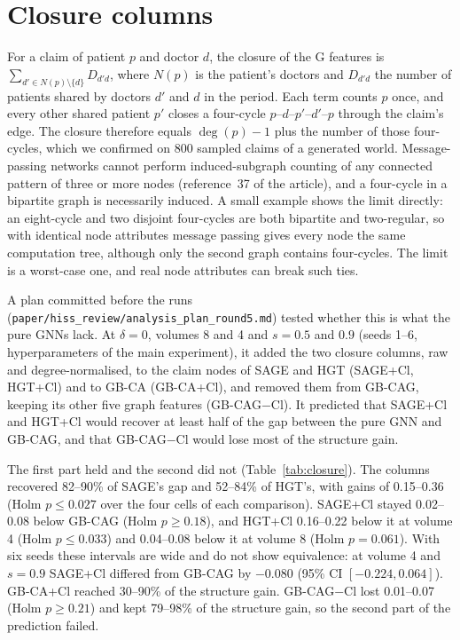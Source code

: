 \documentclass[pdflatex,sn-vancouver-num]{sn-jnl}
\newcommand{\MainRefChen}{37}
\begin{document}
\section{Closure columns}\label{sec:s_closure}
For a claim of patient $p$ and doctor $d$, the closure of the G features is
$\sum_{d'\in N(p)\setminus\{d\}} D_{d'd}$, where $N(p)$ is the patient's doctors and $D_{d'd}$ the number of
patients shared by doctors $d'$ and $d$ in the period. Each term counts $p$ once, and every other shared patient
$p'$ closes a four-cycle $p$--$d$--$p'$--$d'$--$p$ through the claim's edge. The closure therefore equals
$\deg(p)-1$ plus the number of those four-cycles, which we confirmed on 800 sampled claims of a generated world.
Message-passing networks cannot perform induced-subgraph counting of any connected pattern of three or more nodes
(reference~\MainRefChen{} of the article), and a four-cycle in a bipartite graph is necessarily induced. A small
example shows the limit directly: an eight-cycle and two disjoint four-cycles are both bipartite and two-regular, so
with identical node attributes message passing gives every node the same computation tree, although only the second
graph contains four-cycles. The limit is a worst-case one, and real node attributes can break such ties.

A plan committed before the runs (\texttt{paper/\allowbreak hiss\_review/\allowbreak analysis\_plan\_round5.md}) tested whether this is what
the pure GNNs lack. At $\delta=0$, volumes 8 and 4 and $s=0.5$ and $0.9$ (seeds 1--6, hyperparameters of the main
experiment), it added the two closure columns, raw and degree-normalised, to the claim nodes of SAGE and HGT
(SAGE+Cl, HGT+Cl) and to GB-CA (GB-CA+Cl), and removed them from GB-CAG, keeping its other five graph features
(GB-CAG$-$Cl). It predicted that SAGE+Cl and HGT+Cl would recover at least half of the gap between the pure GNN and
GB-CAG, and that GB-CAG$-$Cl would lose most of the structure gain.

The first part held and the second did not (Table~\ref{tab:closure}). The columns recovered 82--90\% of SAGE's gap
and 52--84\% of HGT's, with gains of 0.15--0.36 (Holm $p\le0.027$ over the four cells of each comparison). SAGE+Cl
stayed 0.02--0.08 below GB-CAG (Holm $p\ge0.18$), and HGT+Cl 0.16--0.22 below it at volume 4 (Holm $p\le0.033$) and
0.04--0.08 below it at volume 8 (Holm $p=0.061$). With six seeds these intervals are wide and do not show
equivalence: at volume 4 and $s=0.9$ SAGE+Cl differed from GB-CAG by $-0.080$ (95\% CI $[-0.224, 0.064]$). GB-CA+Cl
reached 30--90\% of the structure gain. GB-CAG$-$Cl lost 0.01--0.07 (Holm $p\ge0.21$) and kept 79--98\% of the
structure gain, so the second part of the prediction failed.
\end{document}
